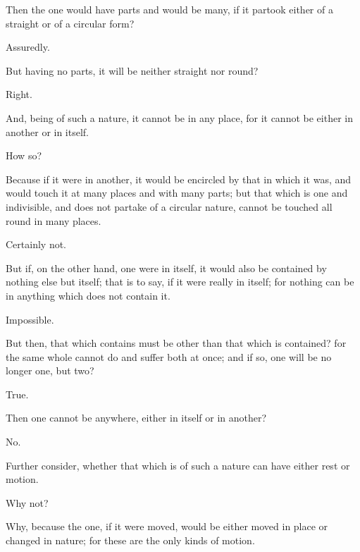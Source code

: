 \documentclass[11pt,letter]{article}
\begin{document}
\par  Then the one would have parts and would be many, if it partook either of a straight or of a circular form?

\par  Assuredly.

\par  But having no parts, it will be neither straight nor round?

\par  Right.

\par  And, being of such a nature, it cannot be in any place, for it cannot be either in another or in itself.

\par  How so?

\par  Because if it were in another, it would be encircled by that in which it was, and would touch it at many places and with many parts; but that which is one and indivisible, and does not partake of a circular nature, cannot be touched all round in many places.

\par  Certainly not.

\par  But if, on the other hand, one were in itself, it would also be contained by nothing else but itself; that is to say, if it were really in itself; for nothing can be in anything which does not contain it.

\par  Impossible.

\par  But then, that which contains must be other than that which is contained? for the same whole cannot do and suffer both at once; and if so, one will be no longer one, but two?

\par  True.

\par  Then one cannot be anywhere, either in itself or in another?

\par  No.

\par  Further consider, whether that which is of such a nature can have either rest or motion.

\par  Why not?

\par  Why, because the one, if it were moved, would be either moved in place or changed in nature; for these are the only kinds of motion.
\end{document}
